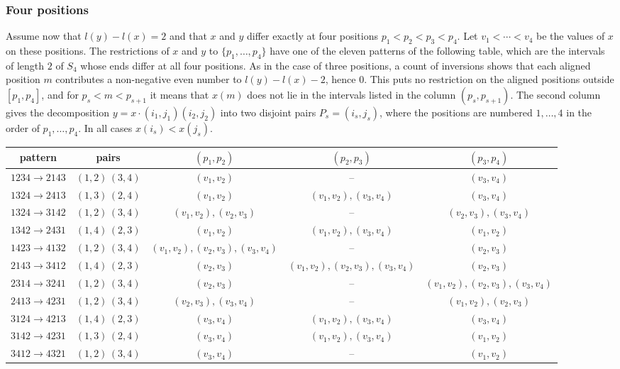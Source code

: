 \documentclass[a4paper,12pt,leqno]{amsart}
\theoremstyle{plain}
\theoremstyle{definition}
\theoremstyle{definition}
\begin{document}
\subsubsection{Four positions} Assume now that $l(y)-l(x)=2$ and that $x$ and $y$ differ exactly at
four positions $p_1<p_2<p_3<p_4$. Let $v_1<\cdots<v_4$ be the values of $x$ on these positions. The
restrictions of $x$ and $y$ to $\{p_1,\ldots,p_4\}$ have one of the eleven patterns of the
following table, which are the intervals of length $2$ of $S_4$ whose ends differ at all four
positions. As in the case of three positions, a count of inversions shows that each aligned
position $m$ contributes a non-negative even number to $l(y)-l(x)-2$, hence $0$. This puts no
restriction on the aligned positions outside $[p_1,p_4]$, and for $p_s<m<p_{s+1}$ it means that
$x(m)$ does not lie in the intervals listed in the column $(p_s,p_{s+1})$. The second column gives
the decomposition $y=x\cdot(i_1,j_1)(i_2,j_2)$ into two disjoint pairs $P_s=(i_s,j_s)$, where the
positions are numbered $1,\ldots,4$ in the order of $p_1,\ldots,p_4$. In all cases $x(i_s)<x(j_s)$.
\begin{center}
{\footnotesize\setlength{\tabcolsep}{3pt}
\begin{tabular}{c|c|c|c|c}
pattern & pairs & $(p_1,p_2)$ & $(p_2,p_3)$ & $(p_3,p_4)$\\ \hline
$1234\rightarrow2143$ & $(1,2)\,(3,4)$ & $(v_1,v_2)$ & -- & $(v_3,v_4)$\\
$1324\rightarrow2413$ & $(1,3)\,(2,4)$ & $(v_1,v_2)$ & $(v_1,v_2), (v_3,v_4)$ & $(v_3,v_4)$\\
$1324\rightarrow3142$ & $(1,2)\,(3,4)$ & $(v_1,v_2), (v_2,v_3)$ & -- & $(v_2,v_3), (v_3,v_4)$\\
$1342\rightarrow2431$ & $(1,4)\,(2,3)$ & $(v_1,v_2)$ & $(v_1,v_2), (v_3,v_4)$ & $(v_1,v_2)$\\
$1423\rightarrow4132$ & $(1,2)\,(3,4)$ & $(v_1,v_2), (v_2,v_3), (v_3,v_4)$ & -- & $(v_2,v_3)$\\
$2143\rightarrow3412$ & $(1,4)\,(2,3)$ & $(v_2,v_3)$ & $(v_1,v_2), (v_2,v_3), (v_3,v_4)$ & $(v_2,v_3)$\\
$2314\rightarrow3241$ & $(1,2)\,(3,4)$ & $(v_2,v_3)$ & -- & $(v_1,v_2), (v_2,v_3), (v_3,v_4)$\\
$2413\rightarrow4231$ & $(1,2)\,(3,4)$ & $(v_2,v_3), (v_3,v_4)$ & -- & $(v_1,v_2), (v_2,v_3)$\\
$3124\rightarrow4213$ & $(1,4)\,(2,3)$ & $(v_3,v_4)$ & $(v_1,v_2), (v_3,v_4)$ & $(v_3,v_4)$\\
$3142\rightarrow4231$ & $(1,3)\,(2,4)$ & $(v_3,v_4)$ & $(v_1,v_2), (v_3,v_4)$ & $(v_1,v_2)$\\
$3412\rightarrow4321$ & $(1,2)\,(3,4)$ & $(v_3,v_4)$ & -- & $(v_1,v_2)$
\end{tabular}}
\end{center}
\end{document}

